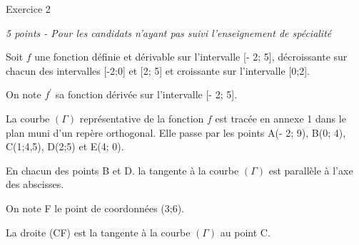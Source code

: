 
%
\begin{h2}Exercice 2\end{h2}
\textit{5 points - Pour les candidats n'ayant pas suivi l'enseignement de spécialité}
\par
Soit $f$ une fonction définie et dérivable sur l'intervalle [- 2; 5], décroissante sur chacun des intervalles [-2;0] et [2; 5] et croissante sur l'intervalle [0;2].
\par
On note $f^{\prime}$ sa fonction dérivée sur l'intervalle [- 2; 5].
\par
La courbe $\left(\Gamma \right)$ représentative de la fonction $f$ est tracée en annexe 1 dans le plan muni d'un repère orthogonal.  Elle passe par les points A(- 2; 9), B(0; 4), C(1;4,5), D(2;5) et E(4; 0).
\par
En chacun des points B et D. la tangente à la courbe $\left(\Gamma \right)$ est parallèle à l'axe des abscisses.
\par
On note F le point de coordonnées (3;6).
\par
La droite (CF) est la tangente à la courbe $\left(\Gamma \right)$ au point C.

\begin{center}
\end{center}

